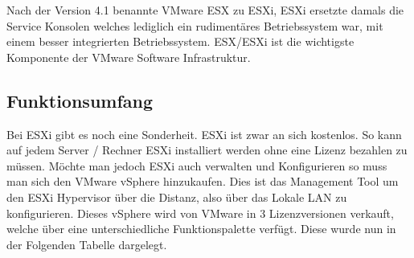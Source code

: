 \documentclass[14pt]{extreport}
\begin{document}
Nach der Version 4.1 benannte VMware ESX zu ESXi, ESXi ersetzte damals die Service Konsolen welches lediglich ein rudimentäres Betriebssystem war, mit einem besser integrierten Betriebssystem. ESX/ESXi ist die wichtigste Komponente der VMware Software Infrastruktur. \\

\subsection{Funktionsumfang}
Bei ESXi gibt es noch eine Sonderheit. ESXi ist zwar an sich kostenlos. So kann auf jedem Server / Rechner ESXi installiert werden ohne eine Lizenz bezahlen zu müssen. Möchte man jedoch ESXi auch verwalten und Konfigurieren so muss man sich den VMware vSphere hinzukaufen. Dies ist das Management Tool um den ESXi Hypervisor über die Distanz, also über das Lokale LAN zu konfigurieren. Dieses vSphere wird von VMware in 3 Lizenzversionen verkauft, welche über eine unterschiedliche Funktionspalette verfügt. Diese wurde nun in der Folgenden Tabelle dargelegt.
\end{document}
